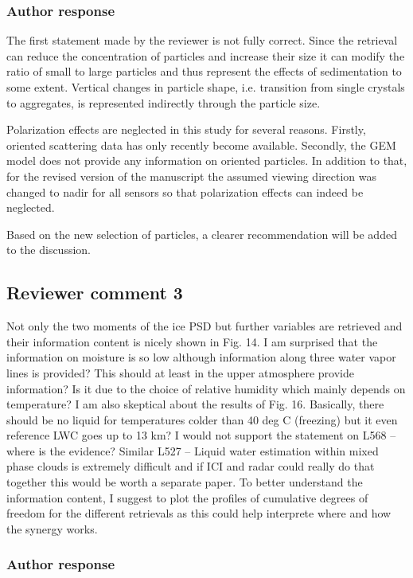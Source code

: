 \documentclass[11pt]{scrartcl}
\begin{document}
\subsubsection*{Author response}

The first statement made by the reviewer is not fully correct. Since the retrieval
can reduce the concentration of particles and increase their size it can modify
the ratio of small to large particles and thus represent the effects of sedimentation
to some extent. Vertical changes in particle shape, i.e. transition from single crystals
to aggregates, is represented indirectly through the particle size.


Polarization effects are neglected in this study for several reasons. Firstly,
oriented scattering data has only recently become available. Secondly, the GEM
model does not provide any information on oriented particles. In addition to that,
for the revised version of the manuscript the assumed viewing direction was changed
to nadir for all sensors so that polarization effects can indeed be neglected.

Based on the new selection of particles, a clearer recommendation will be added to
the discussion.

\subsection*{Reviewer comment 3}

Not only the two moments of the ice PSD but further variables are retrieved and
their information content is nicely shown in Fig. 14. I am surprised that the
information on moisture is so low although information along three water vapor
lines is provided? This should at least in the upper atmosphere provide
information? Is it due to the choice of relative humidity which mainly depends
on temperature? I am also skeptical about the results of Fig. 16. Basically,
there should be no liquid for temperatures colder than 40 deg C (freezing) but
it even reference LWC goes up to 13 km? I would not support the statement on
L568 – where is the evidence? Similar L527 – Liquid water estimation within
mixed phase clouds is extremely difficult and if ICI and radar could really do
that together this would be worth a separate paper. To better understand the
information content, I suggest to plot the profiles of cumulative degrees of
freedom for the different retrievals as this could help interprete where and how
the synergy works.

\subsubsection*{Author response}
\end{document}
